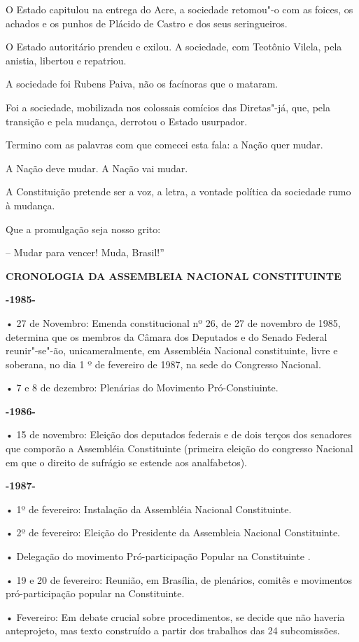 O Estado capitulou na entrega do Acre, a sociedade retomou"-o com as
foices, os achados e os punhos de Plácido de Castro e dos seus
seringueiros.

O Estado autoritário prendeu e exilou. A sociedade, com Teotônio Vilela,
pela anistia, libertou e repatriou.

A sociedade foi Rubens Paiva, não os facínoras que o mataram.

Foi a sociedade, mobilizada nos colossais comícios das Diretas"-já, que,
pela transição e pela mudança, derrotou o Estado usurpador.

Termino com as palavras com que comecei esta fala: a Nação quer mudar.

A Nação deve mudar. A Nação vai mudar.

A Constituição pretende ser a voz, a letra, a vontade política da
sociedade rumo à mudança.

Que a promulgação seja nosso grito:

-- Mudar para vencer! Muda, Brasil!''

\textbf{CRONOLOGIA DA ASSEMBLEIA NACIONAL CONSTITUINTE}

\textbf{-1985-}

• 27 de Novembro: Emenda constitucional nº 26, de 27 de novembro de
1985, determina que os membros da Câmara dos Deputados e do Senado
Federal reunir"-se"-ão, unicameralmente, em Assembléia Nacional
constituinte, livre e soberana, no dia 1 º de fevereiro de 1987, na sede
do Congresso Nacional.

• 7 e 8 de dezembro: Plenárias do Movimento Pró-Constiuinte.

\textbf{-1986-}

• 15 de novembro: Eleição dos deputados federais e de dois terços dos
senadores que comporão a Assembléia Constituinte (primeira eleição do
congresso Nacional em que o direito de sufrágio se estende aos
analfabetos).

\textbf{-1987-}

• 1º de fevereiro: Instalação da Assembléia Nacional Constituinte.

• 2º de fevereiro: Eleição do Presidente da Assembleia Nacional
Constituinte.

• Delegação do movimento Pró-participação Popular na Constituinte .

• 19 e 20 de fevereiro: Reunião, em Brasília, de plenários, comitês e
movimentos pró-participação popular na Constituinte.

• Fevereiro: Em debate crucial sobre procedimentos, se decide que não
haveria anteprojeto, mas texto construído a partir dos trabalhos das 24
subcomissões.

